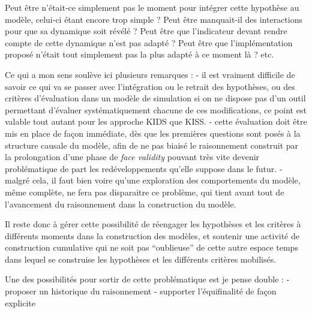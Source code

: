 Peut être n'était-ce simplement pas le moment pour intégrer cette hypothèse au modèle, celui-ci étant encore trop simple ? Peut être manquait-il des interactions pour que sa dynamique soit révélé ? Peut être que l'indicateur devant rendre compte de cette dynamique n'est pas adapté ? Peut être que l'implémentation proposé n'était tout simplement pas la plus adapté à ce moment là ? etc. 

Ce qui a mon sens soulève ici plusieurs remarques : 
- il est vraiment difficile de savoir ce qui va se passer avec l'intégration ou le retrait des hypothèses, ou des critères d'évaluation dans un modèle de simulation si on ne dispose pas d'un outil permettant d'évaluer systématiquement chacune de ces modifications, ce point est valable tout autant pour les approche KIDS que KISS.
- cette évaluation doit être mis en place de façon immédiate, dès que les premières questions sont posés à la structure causale du modèle, afin de ne pas biaisé le raisonnement construit par la prolongation d'une phase de \textit{face validity} pouvant très vite devenir problématique de part les redéveloppements qu'elle suppose dans le futur.
- malgré cela, il faut bien voire qu'une exploration des comportements du modèle, même complète, ne fera pas disparaitre ce problème, qui tient avant tout de l'avancement du raisonnement dans la construction du modèle.

Il reste donc à gérer cette possibilité de réengager les hypothèses et les critères à différents moments dans la construction des modèles, et soutenir une activité de construction cumulative qui ne soit pas \enquote{oublieuse} de cette autre espace temps dans lequel se construise les hypothèses et les différents critères mobilisés. 




Une des possibilités pour sortir de cette problématique est je pense double : 
- proposer un historique du raisonnement
- supporter l'équifinalité de façon explicite